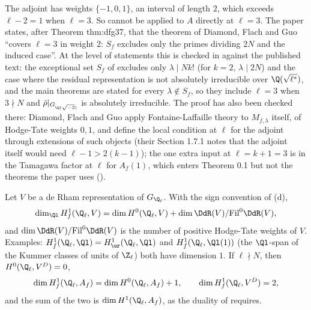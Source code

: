 \begin{remark}[the case $\ell=3$]\label{rem:blochkato:ell-three}
The adjoint has weights $\{-1,0,1\}$, an interval of length $2$, which exceeds $\ell-2=1$ when $\ell=3$. So  cannot be
applied to $A$ directly at $\ell=3$. The paper states, after Theorem thm:dfg37, that the theorem of Diamond, Flach and Guo ``covers $\ell=3$ in weight $2$:
$S_f$ excludes only the primes dividing $2N$ and the induced case''. At the level of statements this is
checked in  against the published text: the exceptional set $S_f$ of \cite{DFG04} excludes only $\lambda\mid Nk!$ (for $k=2$, $\lambda\mid2N$) and the case where the
residual representation is not absolutely irreducible over $\Q(\sqrt{\ell^*})$, and the main theorems are stated for every $\lambda\notin S_f$, so they include $\ell=3$ when $3\nmid N$ and
$\bar\rho|_{G_{\Q(\sqrt{-3})}}$ is absolutely irreducible. The proof has also been checked there: Diamond, Flach and Guo apply Fontaine-Laffaille theory to $M_{f,\lambda}$ itself, of Hodge-Tate weights $0,1$, and define the
local condition at $\ell$ for the adjoint through extensions of such objects (their Section 1.7.1 notes that the adjoint itself would need $\ell-1>2(k-1)$); the one extra input at $\ell=k+1=3$ is
in the Tamagawa factor at $\ell$ for $A_f(1)$, which enters Theorem 0.1 but not the theorems the paper uses ().
\end{remark}

\begin{proposition}\label{prop:blochkato:dimension-formula}
Let $V$ be a de Rham representation of $G_{\Q_\ell}$. With the sign convention of (d),
\[
\dim_{\Ql}H^1_f(\Q_\ell,V)=\dim H^0(\Q_\ell,V)+\dim\DdR(V)/\mathrm{Fil}^0\DdR(V),
\]
and $\dim\DdR(V)/\mathrm{Fil}^0\DdR(V)$ is the number of positive Hodge-Tate weights of $V$. Examples: $H^1_f(\Q_\ell,\Ql)=H^1_{\ur}(\Q_\ell,\Ql)$ and
$H^1_f(\Q_\ell,\Ql(1))$ (the $\Ql$-span of the Kummer classes of units of $\Z_\ell$) both have dimension $1$. If $\ell\nmid N$, then $H^0(\Q_\ell,V^D)=0$,
\[
\dim H^1_f(\Q_\ell,A_f)=\dim H^0(\Q_\ell,A_f)+1,\qquad\dim H^1_f(\Q_\ell,V^D)=2,
\]
and the sum of the two is $\dim H^1(\Q_\ell,A_f)$, as the duality of  requires.
\end{proposition}

